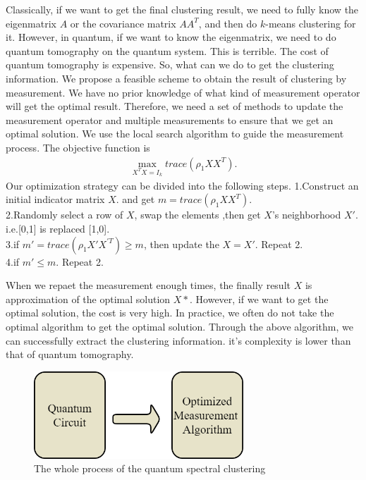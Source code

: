 \documentclass[onecolumn,notitlepage]{revtex4-1}
\begin{document}
Classically, if we want to get the final clustering result, we need to fully know the eigenmatrix $A$ or the covariance matrix $AA^T$, and then do $k$-means clustering for it. However, in quantum, if we want to know the eigenmatrix, we need to do quantum tomography on the quantum system. This is terrible. The cost of quantum tomography is expensive. So, what can we do to get the clustering information. We propose a feasible scheme to obtain the result of clustering by measurement. We have no prior knowledge of what kind of measurement operator will get the optimal result. Therefore, we need a set of methods to update the measurement operator and multiple measurements to ensure that we get an optimal solution. We use the local search algorithm to guide the measurement process. 
The objective function is 
\begin{align}
    \max_{X^TX=I_{k}} trace(\rho_{1} XX^T).
\end{align}
Our optimization strategy can be divided into the following steps.
1.Construct an initial indicator matrix $X$. and get $m=trace(\rho_{1} XX^T)$.\\
2.Randomly select a row of $X$, swap the elements ,then get $X$'s neighborhood $X'$. i.e.[0,1] is replaced [1,0].\\
3.if $m'=trace(\rho_{1} X'X^{'T}) \geq m$, then update the $X=X'$. Repeat 2.\\
4.if $m'\leq m$. Repeat 2.

When we repaet the measurement enough times, the finally result $X$ is approximation of the optimal solution $X*$. However, if we want to get the optimal solution, the cost is very high. In practice, we often do not take the optimal algorithm to get the optimal solution. Through the above algorithm, we can successfully extract the clustering information. it's complexity is lower than that of quantum tomography.

\begin{figure}[H] %
    \centering %
    \includegraphics[width=0.7\textwidth]{image//algorithm.png} %
    \caption{The whole process of the quantum spectral clustering} %
    \label{Fig.main2} %
\end{figure}
\end{document}
